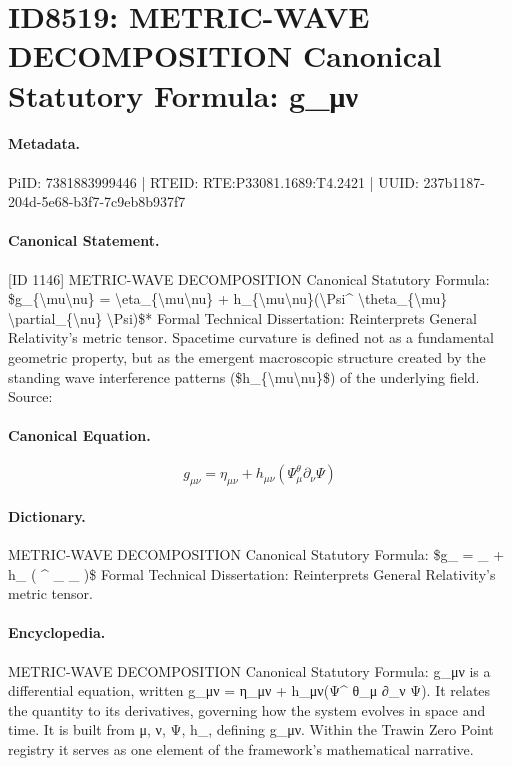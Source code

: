 \section*{ID8519: METRIC-WAVE DECOMPOSITION Canonical Statutory Formula: g\_μν}
\paragraph{Metadata.}
PiID: 7381883999446 | RTEID: RTE:P33081.1689:T4.2421 | UUID: 237b1187-204d-5e68-b3f7-7c9eb8b937f7

\paragraph{Canonical Statement.}
[ID 1146] METRIC-WAVE DECOMPOSITION Canonical Statutory Formula: \$g\_\{\textbackslash{}mu\textbackslash{}nu\} = \textbackslash{}eta\_\{\textbackslash{}mu\textbackslash{}nu\} + h\_\{\textbackslash{}mu\textbackslash{}nu\}(\textbackslash{}Psi\textasciicircum{} \textbackslash{}theta\_\{\textbackslash{}mu\} \textbackslash{}partial\_\{\textbackslash{}nu\} \textbackslash{}Psi)\$* Formal Technical Dissertation: Reinterprets General Relativity's metric tensor. Spacetime curvature is defined not as a fundamental geometric property, but as the emergent macroscopic structure created by the standing wave interference patterns (\$h\_\{\textbackslash{}mu\textbackslash{}nu\}\$) of the underlying field. Source:

\paragraph{Canonical Equation.}
\[
g_{\mu\nu} = \eta_{\mu\nu} + h_{\mu\nu}(\Psi^ \theta_{\mu} \partial_{\nu} \Psi)
\]

\paragraph{Dictionary.}
METRIC-WAVE DECOMPOSITION Canonical Statutory Formula: \$g\_ = \_ + h\_ ( \textasciicircum{} \_ \_ )\$ Formal Technical Dissertation: Reinterprets General Relativity's metric tensor.

\paragraph{Encyclopedia.}
METRIC-WAVE DECOMPOSITION Canonical Statutory Formula: g\_μν is a differential equation, written g\_μν = η\_μν + h\_μν(Ψ\textasciicircum{} θ\_μ ∂\_ν Ψ). It relates the quantity to its derivatives, governing how the system evolves in space and time. It is built from μ, ν, Ψ, h\_, defining g\_μν. Within the Trawin Zero Point registry it serves as one element of the framework's mathematical narrative.
